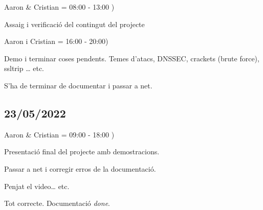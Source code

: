 \documentclass[]{article}
\begin{document}
Aaron \& Cristian = 08:00 - 13:00 )

Assaig i verificació del contingut del projecte

Aaron i Cristian = 16:00 - 20:00)

Demo i terminar coses pendents. Temes d'atacs, DNSSEC, crackets (brute
force), ssltrip \ldots{} etc.

S'ha de terminar de documentar i passar a net.

\hypertarget{section-24}{%
\subsection{23/05/2022}\label{section-24}}

Aaron \& Cristian = 09:00 - 18:00 )

Presentació final del projecte amb demostracions.

Passar a net i corregir erros de la documentació.

Penjat el video\ldots{} etc.

Tot correcte. Documentació \emph{done}.
\end{document}
